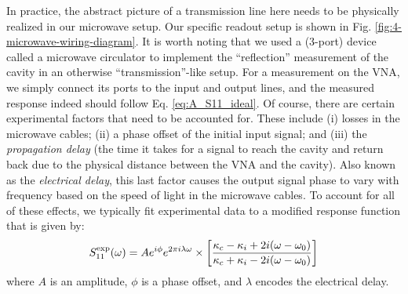 In practice, the abstract picture of a transmission line here needs to be physically realized in our microwave setup. Our specific readout setup is shown in Fig. \ref{fig:4-microwave-wiring-diagram}. It is worth noting that we used a (3-port) device called a microwave circulator to implement the ``reflection'' measurement of the cavity in an otherwise ``transmission''-like setup. For a measurement on the VNA, we simply connect its ports to the input and output lines, and the measured response indeed should follow Eq. \eqref{eq:A_S11_ideal}. Of course, there are certain experimental factors that need to be accounted for. These include (i) losses in the microwave cables; (ii) a phase offset of the initial input signal; and (iii) the \textit{propagation delay} (the time it takes for a signal to reach the cavity and return back due to the physical distance between the VNA and the cavity). Also known as the \textit{electrical delay}, this last factor causes the output signal phase to vary with frequency based on the speed of light in the microwave cables. To account for all of these effects, we typically fit experimental data to a modified response function that is given by:
\begin{equation}
   S_{11}^{\rm exp}(\omega) = Ae^{i\phi} e^{2\pi i\lambda\omega} \times \bigg[\frac{\kappa_c - \kappa_i + 2i(\omega - \omega_0)}{\kappa_c + \kappa_i - 2i(\omega - \omega_0)}\bigg]
\end{equation}
where $A$ is an amplitude, $\phi$ is a phase offset, and $\lambda$ encodes the electrical delay. 






